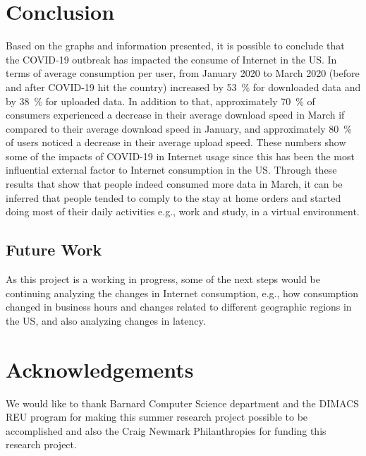 \documentclass[conference]{IEEEtran}
\begin{document}
\section{Conclusion}
\label{sec:conclusion}
Based on the graphs and information presented, it is possible to conclude that the COVID-19 outbreak has impacted the consume of Internet in the US. In terms of average consumption per user, from January 2020 to March 2020 (before and after COVID-19 hit the country) increased by \SI{53}{\percent} for downloaded data and by \SI{38}{\percent} for uploaded data. In addition to that, approximately \SI{70}{\percent} of consumers experienced a decrease in their average download speed in March if compared to their average download speed in January, and approximately \SI{80}{\percent} of users noticed a decrease in their average upload speed. These numbers show some of the impacts of COVID-19 in  Internet usage since this has been the most influential external factor to  Internet consumption in the US. Through these results that show that people indeed consumed more data in March, it can be inferred that people tended to comply to the stay at home orders and started doing most of their daily activities e.g., work and study, in a virtual environment. 

\subsection{Future Work}
As this project is a working in progress, some of the next steps would be continuing analyzing the changes in  Internet consumption, e.g., how consumption changed in business hours and changes related to different geographic regions in the US, and also analyzing changes in latency.

\section{Acknowledgements}
\label{sec:acknowledgements}
We would like to thank Barnard Computer Science department and the DIMACS REU program for making this summer research project possible to be accomplished and also the Craig Newmark Philanthropies for funding this research project. 





\end{document}

